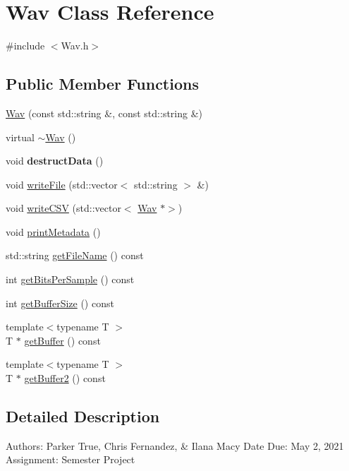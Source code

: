 \hypertarget{classWav}{}\section{Wav Class Reference}
\label{classWav}


{\ttfamily \#include $<$Wav.\+h$>$}

\subsection*{Public Member Functions}
\begin{DoxyCompactItemize}
\item 
\hyperlink{classWav_a573605770be554fbf416e72e0f9109fe}{Wav} (const std\+::string \&, const std\+::string \&)
\item 
virtual \hyperlink{classWav_a1510b246ba121b103a60b8e7839af25f}{$\sim$\+Wav} ()
\item 
\mbox{\label{classWav_a038085c64b750429419523e58cef4a90}} 
void {\bfseries destruct\+Data} ()
\item 
void \hyperlink{classWav_a6569b629ca9e46d0093f8bfd23d92735}{write\+File} (std\+::vector$<$ std\+::string $>$ \&)
\item 
void \hyperlink{classWav_a6f8162ea823152663dd7f556612c220e}{write\+C\+SV} (std\+::vector$<$ \hyperlink{classWav}{Wav} $\ast$$>$)
\item 
void \hyperlink{classWav_a52240b5a0803b1fd074b98d79b51e589}{print\+Metadata} ()
\item 
std\+::string \hyperlink{classWav_ab091dcb5c70b025779d4073e344e60f2}{get\+File\+Name} () const
\item 
int \hyperlink{classWav_af3aaf1636defa1288d866725e39c7f69}{get\+Bits\+Per\+Sample} () const
\item 
int \hyperlink{classWav_a71fdfa1d9f5e7c1b86f07bbff4249dca}{get\+Buffer\+Size} () const
\item 
{\footnotesize template$<$typename T $>$ }\\T $\ast$ \hyperlink{classWav_ac236b8cc7453f5dd6cc0623b5c200bee}{get\+Buffer} () const
\item 
{\footnotesize template$<$typename T $>$ }\\T $\ast$ \hyperlink{classWav_aca22bfd496dad7ecf80e17a691ab1c4c}{get\+Buffer2} () const
\end{DoxyCompactItemize}


\subsection{Detailed Description}
Authors\+: Parker True, Chris Fernandez, \& Ilana Macy Date Due\+: May 2, 2021 Assignment\+: Semester Project 


